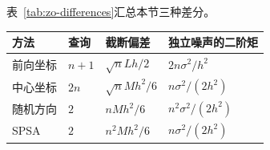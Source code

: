 表~\ref{tab:zo-differences}汇总本节三种差分。

\begin{BookInlineTable}
  \centering
  \begin{tabular}{@{}llll@{}}
    \toprule
    方法 & 查询 & 截断偏差 & 独立噪声的二阶矩\\
    \midrule
    前向坐标 & $n+1$ & $\sqrt{n}Lh/2$ & $2n\sigma^2/h^2$\\
    中心坐标 & $2n$ & $\sqrt{n}Mh^2/6$ & $n\sigma^2/(2h^2)$\\
    随机方向 & $2$ & $nMh^2/6$ & $n^2\sigma^2/(2h^2)$\\
    SPSA & $2$ & $n^2Mh^2/6$ & $n\sigma^2/(2h^2)$\\
    \bottomrule
  \end{tabular}
  \caption{三种差分的成本与误差。偏差为欧氏范数的上界，SPSA一行由式~\eqref{eq:zo-spsa-bias}乘$\sqrt{n}$得到。独立噪声的二阶矩指$\mathbb{E}\lVert\text{噪声造成的估计误差}\rVert_2^2$，SPSA的$h$是坐标尺度，位移长度为$h\sqrt{n}$。}
  \label{tab:zo-differences}
\end{BookInlineTable}
